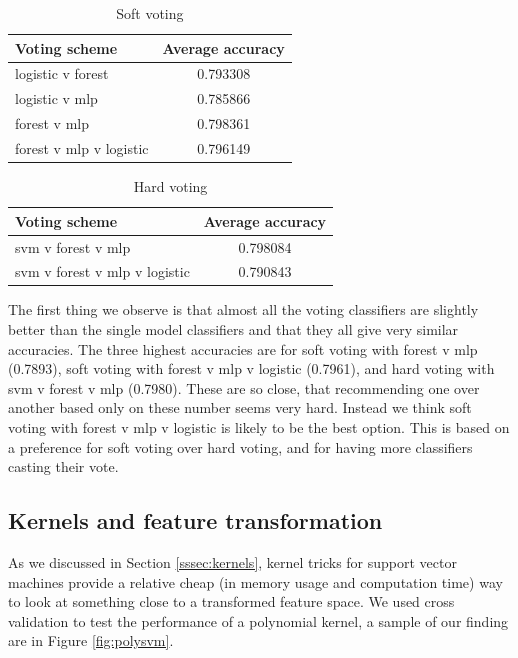 \documentclass[parskip=half]{scrartcl}
\theoremstyle{definition}
\theoremstyle{remark}
\begin{document}
\begin{table} 
\caption{Soft voting} \label{tab:softvoting}
\begin{center}
\begin{tabular}{lc}
Voting scheme & Average accuracy \\ 
\hline 
\hline
logistic v forest & 0.793308 \\ 
logistic v mlp & 0.785866 \\ 
forest v mlp & 0.798361 \\ 
forest v mlp v logistic &  0.796149 \\ 
\end{tabular} 
\end{center} 
\end{table}
 
\begin{table} 
\caption{Hard voting} \label{tab:hardvoting}
\begin{center}
\begin{tabular}{lc}
Voting scheme & Average accuracy \\ 
\hline 
\hline
svm v forest v mlp &  0.798084 \\ 
svm v forest v mlp v logistic & 0.790843 \\ 
\end{tabular} 
\end{center} 
\end{table}

The first thing we observe is that almost all the voting classifiers are slightly better than the single model classifiers and that they all give very similar accuracies. 
The three highest accuracies are for soft voting with forest v mlp (0.7893), soft voting with forest v mlp v logistic (0.7961), and hard voting with svm v forest v mlp (0.7980).
These are so close, that recommending one over another based only on these number seems very hard.   
Instead we think soft voting with forest v mlp v logistic is likely to be the best option.
This is based on a preference for soft voting over hard voting, and for having more classifiers casting their vote.  

\subsection{Kernels and feature transformation}
 
As we discussed in Section \ref{sssec:kernels}, kernel tricks for support vector machines provide a relative cheap (in memory usage and computation time) way to look at something close to a transformed feature space. 
We used cross validation to test the performance of a polynomial kernel, a sample of our finding are in Figure \ref{fig:polysvm}.
\end{document}
